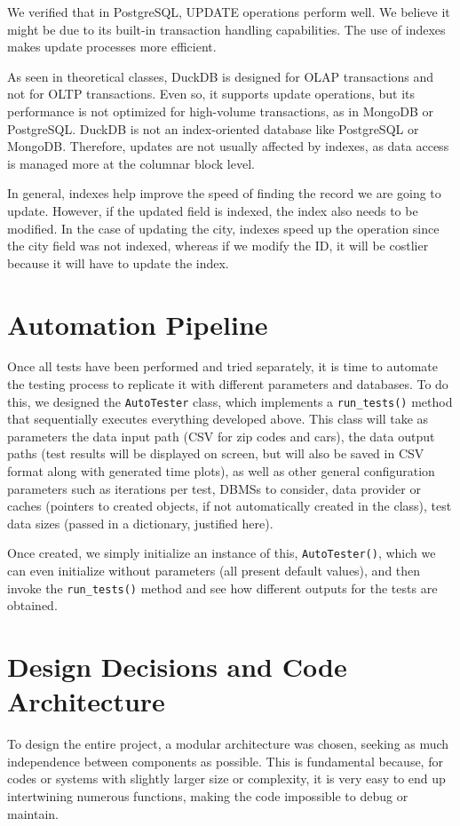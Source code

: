 \documentclass[11pt,a4paper]{article}
\begin{document}
We verified that in PostgreSQL, UPDATE operations perform well. We believe it might be due to its built-in transaction handling capabilities. The use of indexes makes update processes more efficient.

As seen in theoretical classes, DuckDB is designed for OLAP transactions and not for OLTP transactions. Even so, it supports update operations, but its performance is not optimized for high-volume transactions, as in MongoDB or PostgreSQL. DuckDB is not an index-oriented database like PostgreSQL or MongoDB. Therefore, updates are not usually affected by indexes, as data access is managed more at the columnar block level.

In general, indexes help improve the speed of finding the record we are going to update. However, if the updated field is indexed, the index also needs to be modified. In the case of updating the city, indexes speed up the operation since the city field was not indexed, whereas if we modify the ID, it will be costlier because it will have to update the index.

\section{Automation Pipeline}
Once all tests have been performed and tried separately, it is time to automate the testing process to replicate it with different parameters and databases. To do this, we designed the \texttt{AutoTester} class, which implements a \texttt{run\_tests()} method that sequentially executes everything developed above. This class will take as parameters the data input path (CSV for zip codes and cars), the data output paths (test results will be displayed on screen, but will also be saved in CSV format along with generated time plots), as well as other general configuration parameters such as iterations per test, DBMSs to consider, data provider or caches (pointers to created objects, if not automatically created in the class), test data sizes (passed in a dictionary, justified here).

Once created, we simply initialize an instance of this, \texttt{AutoTester()}, which we can even initialize without parameters (all present default values), and then invoke the \texttt{run\_tests()} method and see how different outputs for the tests are obtained.

\section{Design Decisions and Code Architecture}
To design the entire project, a modular architecture was chosen, seeking as much independence between components as possible. This is fundamental because, for codes or systems with slightly larger size or complexity, it is very easy to end up intertwining numerous functions, making the code impossible to debug or maintain.
\end{document}
